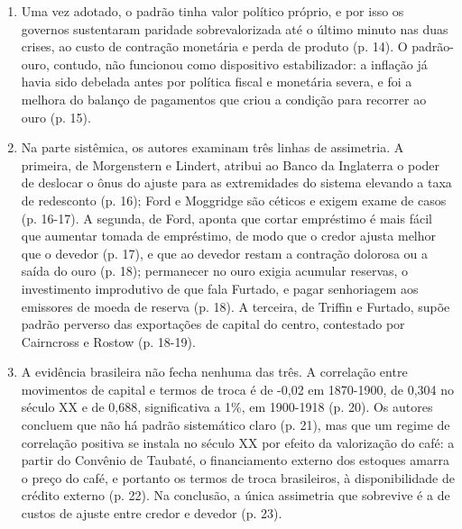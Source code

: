 \begin{enumerate}[leftmargin=*,nosep]
\item Uma vez adotado, o padrão tinha valor político próprio, e por isso os governos sustentaram paridade sobrevalorizada até o último minuto nas duas crises, ao custo de contração monetária e perda de produto (p. 14). O padrão-ouro, contudo, não funcionou como dispositivo estabilizador: a inflação já havia sido debelada antes por política fiscal e monetária severa, e foi a melhora do balanço de pagamentos que criou a condição para recorrer ao ouro (p. 15).

\item Na parte sistêmica, os autores examinam três linhas de assimetria. A primeira, de Morgenstern e Lindert, atribui ao Banco da Inglaterra o poder de deslocar o ônus do ajuste para as extremidades do sistema elevando a taxa de redesconto (p. 16); Ford e Moggridge são céticos e exigem exame de casos (p. 16-17). A segunda, de Ford, aponta que cortar empréstimo é mais fácil que aumentar tomada de empréstimo, de modo que o credor ajusta melhor que o devedor (p. 17), e que ao devedor restam a contração dolorosa ou a saída do ouro (p. 18); permanecer no ouro exigia acumular reservas, o investimento improdutivo de que fala Furtado, e pagar senhoriagem aos emissores de moeda de reserva (p. 18). A terceira, de Triffin e Furtado, supõe padrão perverso das exportações de capital do centro, contestado por Cairncross e Rostow (p. 18-19).

\item A evidência brasileira não fecha nenhuma das três. A correlação entre movimentos de capital e termos de troca é de -0,02 em 1870-1900, de 0,304 no século XX e de 0,688, significativa a 1\%, em 1900-1918 (p. 20). Os autores concluem que não há padrão sistemático claro (p. 21), mas que um regime de correlação positiva se instala no século XX por efeito da valorização do café: a partir do Convênio de Taubaté, o financiamento externo dos estoques amarra o preço do café, e portanto os termos de troca brasileiros, à disponibilidade de crédito externo (p. 22). Na conclusão, a única assimetria que sobrevive é a de custos de ajuste entre credor e devedor (p. 23).
\end{enumerate}


